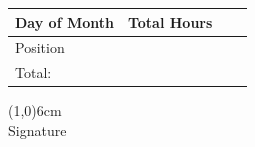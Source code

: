 \documentclass{article}
\begin{document}
\vspace{1mm}
\begin{table}[htbp]
    \begin{tabular}{ | C{2cm} | C{1cm} |  L{13.5cm} | N} \hline
        Day of Month & Total Hours & & \\[10pt] \hline
        Position & & \\[10pt] \hline
        
        Total: & & \\[10pt] \hline
    \end{tabular}
    \label{tab:table}
\end{table}

\vspace{2.5cm}
\noindent \line(1,0){6cm} \\
Signature
\end{document}
